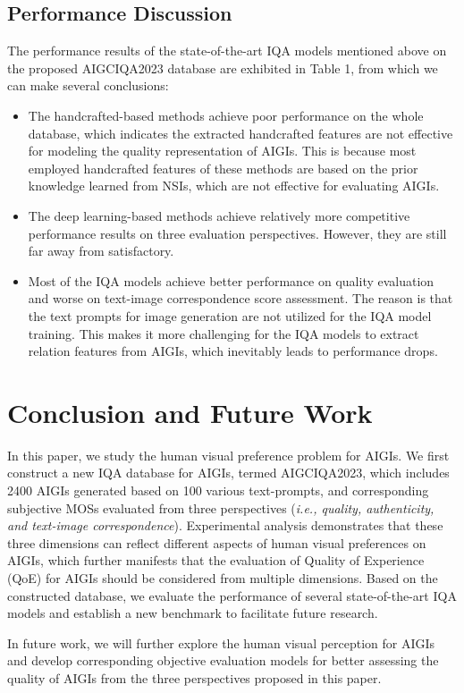 \documentclass[runningheads]{llncs}
\begin{document}
\subsection{Performance Discussion}

The performance results of the state-of-the-art IQA models mentioned above on the proposed AIGCIQA2023 database are exhibited in Table 1, from which we can make several conclusions:
\begin{itemize}
\item The handcrafted-based methods achieve poor performance on the whole database, which indicates the extracted handcrafted features are not effective for modeling the quality representation of AIGIs. This is because most employed handcrafted features of
these methods are based on the prior knowledge learned from NSIs, which are not effective for evaluating AIGIs.

\item The deep learning-based methods achieve relatively more competitive performance results on three evaluation perspectives. However, they are still far away from satisfactory.

\item Most of the IQA models achieve better performance on quality evaluation and worse on text-image correspondence score assessment.
The reason is that the text prompts for image generation are not utilized for the IQA model training. 
This makes it more challenging for the IQA models to extract relation features from AIGIs, which inevitably leads to performance drops.
\end {itemize}


\section{Conclusion and Future Work}
In this paper, we study the human visual preference problem for AIGIs. 
We first construct a new IQA database for AIGIs, termed AIGCIQA2023, which includes 2400 AIGIs generated based on 100 various text-prompts, and corresponding subjective MOSs evaluated from three perspectives (\textit{i.e., quality, authenticity, and text-image correspondence}).
Experimental analysis demonstrates that these three dimensions can reflect different aspects of human visual preferences on AIGIs, which further manifests that the evaluation of Quality of Experience (QoE) for AIGIs should be considered from multiple dimensions.
Based on the constructed database, we evaluate the performance of several state-of-the-art IQA models and establish a new benchmark to facilitate future research.

In future work, we will further explore the human visual perception for AIGIs and develop corresponding objective evaluation models for better assessing the quality of AIGIs from the three perspectives proposed in this paper.

%




\newpage



\end{document}
